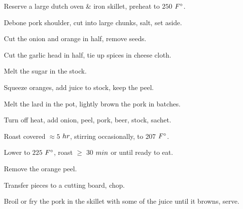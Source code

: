 \begin{preparation}
\item Reserve a large dutch oven \& iron skillet, preheat to $250$ $\Fahrenheit$.
\item Debone pork shoulder, cut into large chunks, salt, set aside.
\item Cut the onion and orange in half, remove seeds.
\item Cut the garlic head in half, tie up spices in cheese cloth.
\item Melt the sugar in the stock.
\item Squeeze oranges, add juice to stock, keep the peel.
\item Melt the lard in the pot, lightly brown the pork in batches.
\item Turn off heat, add onion, peel, pork, beer, stock, sachet.
\item Roast covered $\approx5$ $\hour$, stirring occasionally, to 207 $\Fahrenheit$.
\item Lower to $225$ $\Fahrenheit$, roast $\ge$ 30 $\minute$ or until ready to eat.
\item Remove the orange peel.
\item Transfer pieces to a cutting board, chop.
\item Broil or fry the pork in the skillet with some of the juice until it browns, serve.
\end{preparation}


\recipeend%
